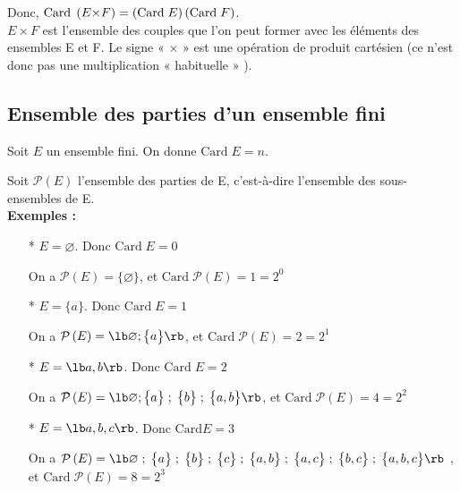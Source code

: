 Donc, $\mathrm{Card} \; \left(E {\Large\times} F\right) = \left(\mathrm{Card} \; E\right)\left(\mathrm{Card} \; F\right)$. \\

$E \times F$ est l’ensemble des couples que l’on peut former avec les éléments des ensembles E et F.
Le signe « $\times$ » est une opération de produit cartésien (ce n’est donc pas une multiplication « habituelle » ).

\subsection{Ensemble des parties d'un ensemble fini}

Soit $E$ un ensemble fini. On donne $\mathrm{Card} \; E = n$.

Soit $\mathcal{P} \left(E\right)$ l'ensemble des parties de E, c'est-à-dire l'ensemble des sous-ensembles de E. \\

\textbf{Exemples : } \\

\begin{itemize}
\item[*] $E = \varnothing$. Donc $\mathrm{Card} \; E = 0$

On a $\mathcal{P} \left(E\right) = \big\lbrace \varnothing \big\rbrace $, et $\mathrm{Card} \; \mathcal{P}\left(E\right)  = 1 = 2^0$ \\

\item[*] $E = \big\lbrace a \big\rbrace $. Donc $\mathrm{Card} \; E = 1$ 

On a $\mathcal{P} \left(E\right) = \lb \varnothing ; \big\lbrace a \big\rbrace \rb $,  et $\mathrm{Card} \; \mathcal{P}\left(E\right)  = 2 = 2^1$ \\
\item[*] $E = \lb a,b \rb $. Donc $\mathrm{Card} \; E = 2$

On a $\mathcal{P} \left(E\right) = \lb \varnothing ;\big\lbrace a \big\rbrace \; ; \; \big\lbrace b \big\rbrace \; ; \; \big\lbrace a,b \big\rbrace \rb $,  et $\mathrm{Card} \; \mathcal{P}\left(E\right)  = 4 = 2^2$ \\
\item[*] $E = \lb a,b,c \rb $. Donc $\mathrm{Card} E = 3$

On a $\mathcal{P} \left(E\right) = \lb \varnothing \; ; \;  \big\lbrace a \big\rbrace \; ; \; \big\lbrace b \big\rbrace \; ; \; \big\lbrace c \big\rbrace \; ; \; \big\lbrace a,b \big\rbrace \; ; \; \big\lbrace a,c \big\rbrace \; ; \; \big\lbrace b,c \big\rbrace \; ; \; \big\lbrace a,b,c \big\rbrace \rb$ , et $\mathrm{Card} \; \mathcal{P}\left(E\right)  = 8 = 2^3$  \\
\end{itemize}

